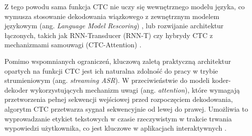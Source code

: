 Z tego powodu sama funkcja CTC nie uczy się wewnętrznego modelu języka, co wymusza stosowanie dekodowania wiązkowego z zewnętrznym modelem językowym (ang. \textit{Language Model Rescoring}) \cite[s.~5]{graves2014towards}, \cite[s.~376]{jurafsky2026} lub rozwijanie architektur łączonych, takich jak RNN-Transducer (RNN-T) czy hybrydy CTC z mechanizmami samouwagi (CTC-Attention) \cite[s.~376--377]{jurafsky2026}.

Pomimo wspomnianych ograniczeń, kluczową zaletą praktyczną architektur opartych na funkcji CTC jest ich naturalna zdolność do pracy w trybie strumieniowym (ang. \textit{streaming ASR}). W przeciwieństwie do modeli koder-dekoder wykorzystujących mechanizm uwagi (ang. \textit{attention}), które wymagają przetworzenia pełnej sekwencji wejściowej przed rozpoczęciem dekodowania, algorytm CTC przetwarza sygnał sekwencyjnie od lewej do prawej. Umożliwia to wyprowadzanie etykiet tekstowych w czasie rzeczywistym w trakcie trwania wypowiedzi użytkownika, co jest kluczowe w aplikacjach interaktywnych \cite[s.~376--377]{jurafsky2026}.


